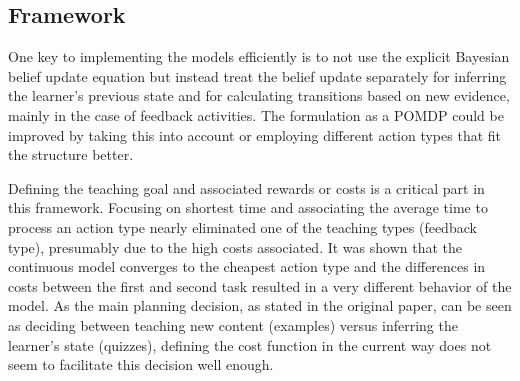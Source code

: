 






\subsection{Framework}
One key to implementing the models efficiently is to not use the explicit Bayesian belief update equation but instead treat the belief update separately for inferring the learner's previous state and for calculating transitions based on new evidence, mainly in the case of feedback activities.
The formulation as a POMDP could be improved by taking this into account or employing different action types that fit the structure better.



Defining the teaching goal and associated rewards or costs is a critical part in this framework.
Focusing on shortest time and associating the average time to process an action type nearly eliminated one of the teaching types (feedback type), presumably due to the high costs associated. 
It was shown that the continuous model converges to the cheapest action type and the differences in costs between the first and second task resulted in a very different behavior of the model.
As the main planning decision, as stated in the original paper, can be seen as deciding between teaching new content (examples) versus inferring the learner's state (quizzes), defining the cost function in the current way does not seem to facilitate this decision well enough. 


